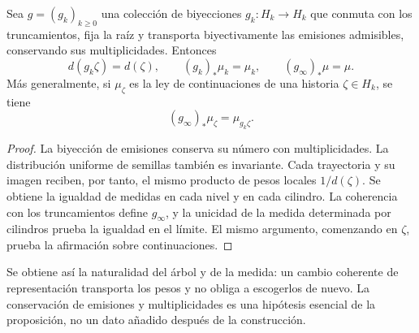 \begin{proposition}
\label{act21:prop:ch-naturalidad-medida}
Sea \(g=(g_k)_{k\geq0}\) una colección de biyecciones \(g_k:H_k\to H_k\)
que conmuta con los truncamientos, fija la raíz y transporta biyectivamente
las emisiones admisibles, conservando sus multiplicidades. Entonces
\[
 d(g_k\zeta)=d(\zeta),\qquad
 (g_k)_*\mu_k=\mu_k,\qquad (g_\infty)_*\mu=\mu.
\]
Más generalmente, si \(\mu_\zeta\) es la ley de continuaciones de una
historia \(\zeta\in H_k\), se tiene
\[
 (g_\infty)_*\mu_\zeta=\mu_{g_k\zeta}.
\]
\end{proposition}

\begin{proof}
La biyección de emisiones conserva su número con multiplicidades. La
distribución uniforme de semillas también es invariante. Cada trayectoria
y su imagen reciben, por tanto, el mismo producto de pesos locales
\(1/d(\zeta)\). Se obtiene la igualdad de medidas en cada nivel y en
cada cilindro. La coherencia con los truncamientos define \(g_\infty\),
y la unicidad de la medida determinada por cilindros prueba la igualdad
en el límite. El mismo argumento, comenzando en \(\zeta\), prueba la
afirmación sobre continuaciones.
\end{proof}

Se obtiene así la naturalidad del árbol y de la medida: un cambio coherente
de representación transporta los pesos y no obliga a escogerlos de nuevo.
La conservación de emisiones y multiplicidades es una hipótesis esencial de
la proposición, no un dato añadido después de la construcción.
